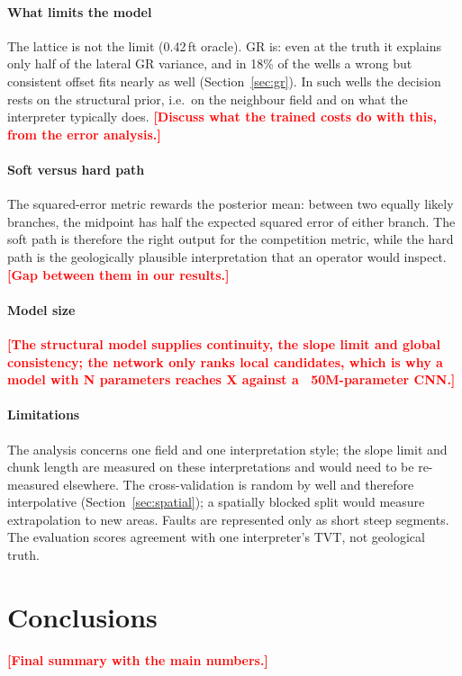 \documentclass[preprint,12pt,authoryear]{elsarticle}
\newcommand{\PH}[1]{\textcolor{red}{\textbf{[#1]}}}
\begin{document}
\paragraph{What limits the model}
The lattice is not the limit (0.42\,ft oracle). GR is: even at the truth it explains only half of the lateral GR variance, and in 18\% of the wells a wrong but consistent offset fits nearly as well (Section~\ref{sec:gr}). In such wells the decision rests on the structural prior, i.e.\ on the neighbour field and on what the interpreter typically does. \PH{Discuss what the trained costs do with this, from the error analysis.}

\paragraph{Soft versus hard path}
The squared-error metric rewards the posterior mean: between two equally likely branches, the midpoint has half the expected squared error of either branch. The soft path is therefore the right output for the competition metric, while the hard path is the geologically plausible interpretation that an operator would inspect. \PH{Gap between them in our results.}

\paragraph{Model size}
\PH{The structural model supplies continuity, the slope limit and global consistency; the network only ranks local candidates, which is why a model with N parameters reaches X against a ~50M-parameter CNN.}

\paragraph{Limitations}
The analysis concerns one field and one interpretation style; the slope limit and chunk length are measured on these interpretations and would need to be re-measured elsewhere. The cross-validation is random by well and therefore interpolative (Section~\ref{sec:spatial}); a spatially blocked split would measure extrapolation to new areas. Faults are represented only as short steep segments. The evaluation scores agreement with one interpreter's TVT, not geological truth.

\section{Conclusions}\label{sec:conclusions}
\PH{Final summary with the main numbers.}
\end{document}
